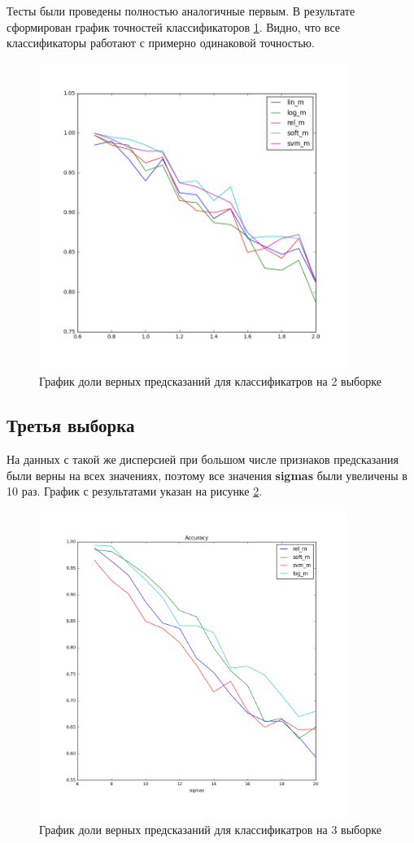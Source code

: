 \documentclass[a4paper]{article}
\begin{document}
Тесты были проведены полностью аналогичные первым. В результате сформирован график точностей классификаторов \ref{pic:im2}. Видно, что все классификаторы работают с примерно одинаковой точностью.

\begin{figure}[H]
\centering
\includegraphics[width=10cm]{second_dataset}
\caption{График доли верных предсказаний для классификатров на 2 выборке}
\label{pic:im2}
\end{figure}

\subsection{Третья выборка}

На данных с такой же дисперсией при большом числе признаков предсказания были верны на всех значениях, поэтому все значения \textbf{sigmas} были увеличены в 10 раз. График с результатами указан на рисунке \ref{pic:im3}.

\begin{figure}[H]
\centering
\includegraphics[width=10cm]{third_dataset}
\caption{График доли верных предсказаний для классификатров на 3 выборке}
\label{pic:im3}
\end{figure}
\end{document}
